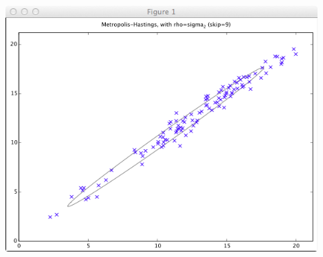\documentclass{jsarticle}
\begin{document}
\begin{itemize}
\includegraphics[width=12cm]{img/mh9.png}
\end{itemize}
\end{document}
